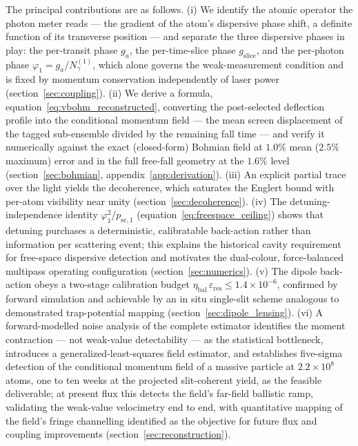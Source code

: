 \documentclass[11pt,a4paper]{article}
\begin{document}
The principal contributions are as follows. (i) We identify the atomic operator the photon meter reads --- the gradient of the atom's dispersive phase shift, a definite function of its transverse position --- and separate the three dispersive phases in play: the per-transit phase $g_a$, the per-time-slice phase $g_\text{slice}$, and the per-photon phase $\varphi_1 = g_a/N_\gamma^{(1)}$, which alone governs the weak-measurement condition and is fixed by momentum conservation independently of laser power (section~\ref{sec:coupling}). (ii) We derive a formula, equation~\eqref{eq:vbohm_reconstructed}, converting the post-selected deflection profile into the conditional momentum field --- the mean screen displacement of the tagged sub-ensemble divided by the remaining fall time --- and verify it numerically against the exact (closed-form) Bohmian field at $1.0\%$ mean ($2.5\%$ maximum) error and in the full free-fall geometry at the $1.6\%$ level (section~\ref{sec:bohmian}, appendix~\ref{app:derivation}). (iii) An explicit partial trace over the light yields the decoherence, which saturates the Englert bound with per-atom visibility near unity (section~\ref{sec:decoherence}). (iv) The detuning-independence identity $\varphi_1^2/p_{\text{sc},1}$ (equation~\eqref{eq:freespace_ceiling}) shows that detuning purchases a deterministic, calibratable back-action rather than information per scattering event; this explains the historical cavity requirement for free-space dispersive detection and motivates the dual-colour, force-balanced multipass operating configuration (section~\ref{sec:numerics}). (v) The dipole back-action obeys a two-stage calibration budget $\eta_\text{bal}\,\varepsilon_\text{res} \leq 1.4\times 10^{-6}$, confirmed by forward simulation and achievable by an in situ single-slit scheme analogous to demonstrated trap-potential mapping (section~\ref{sec:dipole_lensing}). (vi) A forward-modelled noise analysis of the complete estimator identifies the moment contraction --- not weak-value detectability --- as the statistical bottleneck, introduces a generalized-least-squares field estimator, and establishes five-sigma detection of the conditional momentum field of a massive particle at $2.2\times 10^8$ atoms, one to ten weeks at the projected slit-coherent yield, as the feasible deliverable; at present flux this detects the field's far-field ballistic ramp, validating the weak-value velocimetry end to end, with quantitative mapping of the field's fringe channelling identified as the objective for future flux and coupling improvements (section~\ref{sec:reconstruction}).
\end{document}
